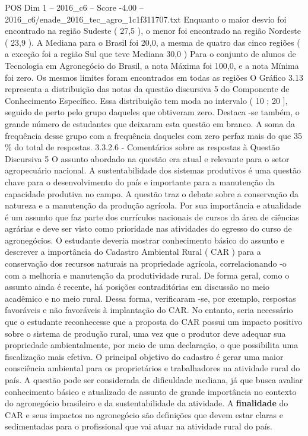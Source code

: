 \begin{textsample}{POS Dim 1 – 2016\_c6 – Score -4.00 – 2016\_c6/enade\_2016\_tec\_agro\_1c1f311707.txt}
Enquanto o maior desvio foi encontrado na região Sudeste ( 27,5 ), o menor foi encontrado na região Nordeste ( 23,9 ).
A Mediana para o Brasil foi 20,0, a mesma de quatro das cinco regiões ( a exceção foi a região Sul que teve Mediana 30,0 ) Para o conjunto de alunos de Tecnologia em Agronegócio do Brasil, a nota Máxima foi 100,0, e a nota Mínima foi zero.
Os mesmos limites foram encontrados em todas as regiões O Gráfico 3.13 representa a distribuição das notas da questão discursiva 5 do Componente de Conhecimento Específico.
Essa distribuição tem moda no intervalo ( 10 ; 20 ], seguido de perto pelo grupo daqueles que obtiveram zero.
Destaca -se também, o grande número de estudantes que deixaram esta questão em branco.
A soma da frequência desse grupo com a frequência daqueles com zero perfaz mais do que 35 \% do total de respostas. 3.3.2.6 - Comentários sobre as respostas à Questão Discursiva 5 O assunto abordado na questão era atual e relevante para o setor agropecuário nacional.
A sustentabilidade dos sistemas produtivos é uma questão chave para o desenvolvimento do país e importante para a manutenção da capacidade produtiva no campo.
A questão traz o debate sobre a conservação da natureza e a manutenção da produção agrícola.
Por sua importância e atualidade é um assunto que faz parte dos currículos nacionais de cursos da área de ciências agrárias e deve ser visto como prioridade nas atividades do egresso do curso de agronegócios.
O estudante deveria mostrar conhecimento básico do assunto e descrever a importância do Cadastro Ambiental Rural ( CAR ) para a conservação dos recursos naturais na propriedade agrícola, correlacionando -o com a melhoria e manutenção da produtividade rural.
De forma geral, como o assunto ainda é recente, há posições contraditórias em discussão no meio acadêmico e no meio rural.
Dessa forma, verificaram -se, por exemplo, respostas favoráveis e não favoráveis à implantação do CAR.
No entanto, seria necessário que o estudante reconhecesse que a proposta do CAR possui um impacto positivo sobre o sistema de produção rural, uma vez que o produtor deve adequar sua propriedade ambientalmente, por meio de uma declaração, o que possibilita uma fiscalização mais efetiva.
O principal objetivo do cadastro é gerar uma maior consciência ambiental para os proprietários e trabalhadores na atividade rural do país.
A questão pode ser considerada de dificuldade mediana, já que busca avaliar conhecimento básico e atualizado de assunto de grande importância no contexto do agronegócio brasileiro e da sustentabilidade da atividade.
A \textbf{finalidade} do CAR e seus impactos no agronegócio são definições que devem estar claras e sedimentadas para o profissional que vai atuar na atividade rural do país.

\end{textsample}
